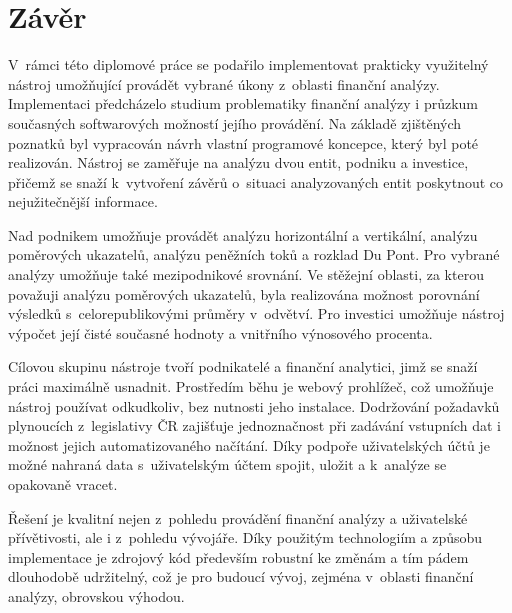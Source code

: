 \chapter{Závěr}
V~rámci této diplomové práce se podařilo implementovat prakticky využitelný nástroj umožňující provádět vybrané úkony z~oblasti finanční analýzy. Implementaci předcházelo studium problematiky finanční analýzy i průzkum současných softwarových možností jejího provádění. Na základě zjištěných poznatků byl vypracován návrh vlastní programové koncepce, který byl poté realizován. Nástroj se zaměřuje na analýzu dvou entit, podniku a investice, přičemž se snaží k~vytvoření závěrů o~situaci analyzovaných entit poskytnout co nejužitečnější informace.

Nad podnikem umožňuje provádět analýzu horizontální a vertikální, analýzu poměrových ukazatelů, analýzu peněžních toků a rozklad Du Pont. Pro vybrané analýzy umožňuje také mezipodnikové srovnání. Ve stěžejní oblasti, za kterou považuji analýzu poměrových ukazatelů, byla realizována možnost porovnání výsledků s~celorepublikovými průměry v~odvětví. Pro investici umožňuje nástroj výpočet její čisté současné hodnoty a vnitřního výnosového procenta.

Cílovou skupinu nástroje tvoří podnikatelé a finanční analytici, jimž se snaží práci maximálně usnadnit. Prostředím běhu je webový prohlížeč, což umožňuje nástroj používat odkudkoliv, bez nutnosti jeho instalace. Dodržování požadavků plynoucích z~legislativy ČR zajišťuje jednoznačnost při zadávání vstupních dat i možnost jejich automatizovaného načítání. Díky podpoře uživatelských účtů je možné nahraná data s~uživatelským účtem spojit, uložit a k~analýze se opakovaně vracet.

Řešení je kvalitní nejen z~pohledu provádění finanční analýzy a uživatelské přívětivosti, ale i z~pohledu vývojáře. Díky použitým technologiím a způsobu implementace je zdrojový kód především robustní ke změnám a tím pádem dlouhodobě udržitelný, což je pro budoucí vývoj, zejména v~oblasti finanční analýzy, obrovskou výhodou.






